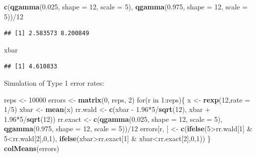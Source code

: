 \documentclass[]{book}
\newenvironment{Shaded}{\begin{snugshade}}{\end{snugshade}}
\newcommand{\KeywordTok}[1]{\textcolor[rgb]{0.13,0.29,0.53}{\textbf{{#1}}}}
\newcommand{\DataTypeTok}[1]{\textcolor[rgb]{0.13,0.29,0.53}{{#1}}}
\newcommand{\DecValTok}[1]{\textcolor[rgb]{0.00,0.00,0.81}{{#1}}}
\newcommand{\FloatTok}[1]{\textcolor[rgb]{0.00,0.00,0.81}{{#1}}}
\newcommand{\StringTok}[1]{\textcolor[rgb]{0.31,0.60,0.02}{{#1}}}
\newcommand{\NormalTok}[1]{{#1}}
\begin{document}
\begin{Shaded}
\begin{Highlighting}[]
\KeywordTok{c}\NormalTok{(}\KeywordTok{qgamma}\NormalTok{(}\FloatTok{0.025}\NormalTok{, }\DataTypeTok{shape =} \DecValTok{12}\NormalTok{, }\DataTypeTok{scale =} \DecValTok{5}\NormalTok{), }\KeywordTok{qgamma}\NormalTok{(}\FloatTok{0.975}\NormalTok{, }\DataTypeTok{shape =} \DecValTok{12}\NormalTok{, }\DataTypeTok{scale =} \DecValTok{5}\NormalTok{))/}\DecValTok{12}
\end{Highlighting}
\end{Shaded}

\begin{verbatim}
## [1] 2.583573 8.200849
\end{verbatim}

\begin{Shaded}
\begin{Highlighting}[]
\NormalTok{xbar}
\end{Highlighting}
\end{Shaded}

\begin{verbatim}
## [1] 4.610833
\end{verbatim}

Simulation of Type 1 error rates:

\begin{Shaded}
\begin{Highlighting}[]
\NormalTok{reps <-}\StringTok{ }\DecValTok{10000}
\NormalTok{errors <-}\StringTok{ }\KeywordTok{matrix}\NormalTok{(}\DecValTok{0}\NormalTok{, reps, }\DecValTok{2}\NormalTok{)}
\NormalTok{for(r in }\DecValTok{1}\NormalTok{:reps)\{}
  \NormalTok{x <-}\StringTok{ }\KeywordTok{rexp}\NormalTok{(}\DecValTok{12}\NormalTok{,}\DataTypeTok{rate =} \DecValTok{1}\NormalTok{/}\DecValTok{5}\NormalTok{)}
  \NormalTok{xbar <-}\StringTok{ }\KeywordTok{mean}\NormalTok{(x)}
  \NormalTok{rr.wald <-}\StringTok{ }\KeywordTok{c}\NormalTok{(xbar -}\StringTok{ }\FloatTok{1.96}\NormalTok{*}\DecValTok{5}\NormalTok{/}\KeywordTok{sqrt}\NormalTok{(}\DecValTok{12}\NormalTok{), xbar +}\StringTok{ }\FloatTok{1.96}\NormalTok{*}\DecValTok{5}\NormalTok{/}\KeywordTok{sqrt}\NormalTok{(}\DecValTok{12}\NormalTok{))}
  \NormalTok{rr.exact <-}\StringTok{ }\KeywordTok{c}\NormalTok{(}\KeywordTok{qgamma}\NormalTok{(}\FloatTok{0.025}\NormalTok{, }\DataTypeTok{shape =} \DecValTok{12}\NormalTok{, }\DataTypeTok{scale =} \DecValTok{5}\NormalTok{), }\KeywordTok{qgamma}\NormalTok{(}\FloatTok{0.975}\NormalTok{, }\DataTypeTok{shape =} \DecValTok{12}\NormalTok{, }\DataTypeTok{scale =} \DecValTok{5}\NormalTok{))/}\DecValTok{12}
  \NormalTok{errors[r, ] <-}\StringTok{ }\KeywordTok{c}\NormalTok{(}\KeywordTok{ifelse}\NormalTok{(}\DecValTok{5}\NormalTok{>rr.wald[}\DecValTok{1}\NormalTok{] &}\StringTok{ }\DecValTok{5}\NormalTok{<rr.wald[}\DecValTok{2}\NormalTok{],}\DecValTok{0}\NormalTok{,}\DecValTok{1}\NormalTok{), }\KeywordTok{ifelse}\NormalTok{(xbar>rr.exact[}\DecValTok{1}\NormalTok{] &}\StringTok{ }\NormalTok{xbar<rr.exact[}\DecValTok{2}\NormalTok{],}\DecValTok{0}\NormalTok{,}\DecValTok{1}\NormalTok{))}
\NormalTok{\}}
\KeywordTok{colMeans}\NormalTok{(errors)}
\end{Highlighting}
\end{Shaded}
\end{document}
